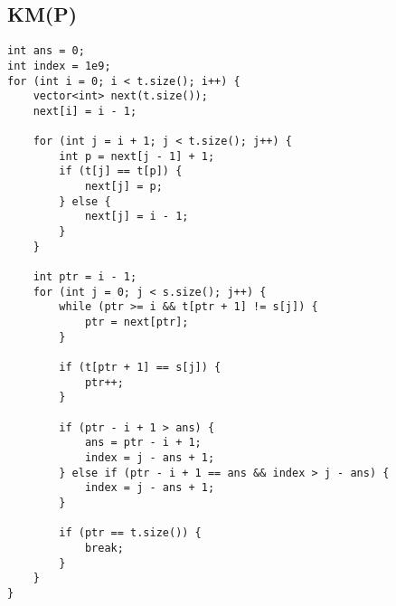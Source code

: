 \subsection{KM(P)}
\begin{lstlisting}
int ans = 0;
int index = 1e9;
for (int i = 0; i < t.size(); i++) {
    vector<int> next(t.size());
    next[i] = i - 1;
    
    for (int j = i + 1; j < t.size(); j++) {
        int p = next[j - 1] + 1;
        if (t[j] == t[p]) {
            next[j] = p;
        } else {
            next[j] = i - 1;
        }
    }

    int ptr = i - 1;
    for (int j = 0; j < s.size(); j++) {
        while (ptr >= i && t[ptr + 1] != s[j]) {
            ptr = next[ptr];
        }

        if (t[ptr + 1] == s[j]) {
            ptr++;
        }

        if (ptr - i + 1 > ans) {
            ans = ptr - i + 1;
            index = j - ans + 1;
        } else if (ptr - i + 1 == ans && index > j - ans) {
            index = j - ans + 1;
        }
        
        if (ptr == t.size()) {
            break;
        }
    }
}
\end{lstlisting}